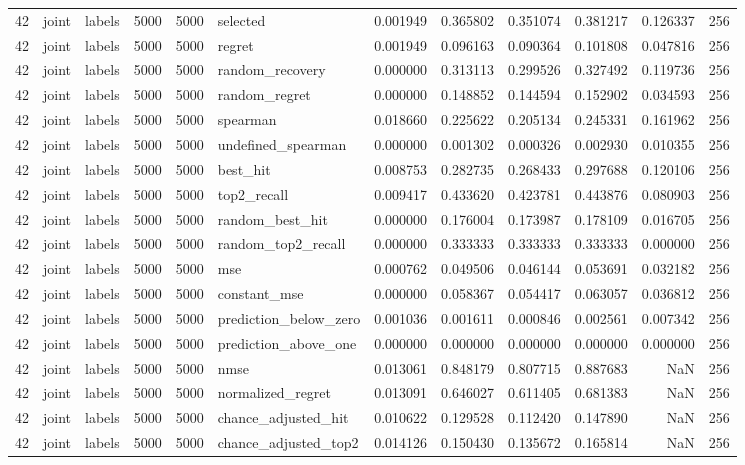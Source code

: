 \begin{tabular}{rllrrlrrrrrr}
42 & joint & labels & 5000 & 5000 & selected & 0.001949 & 0.365802 & 0.351074 & 0.381217 & 0.126337 & 256 \\
42 & joint & labels & 5000 & 5000 & regret & 0.001949 & 0.096163 & 0.090364 & 0.101808 & 0.047816 & 256 \\
42 & joint & labels & 5000 & 5000 & random_recovery & 0.000000 & 0.313113 & 0.299526 & 0.327492 & 0.119736 & 256 \\
42 & joint & labels & 5000 & 5000 & random_regret & 0.000000 & 0.148852 & 0.144594 & 0.152902 & 0.034593 & 256 \\
42 & joint & labels & 5000 & 5000 & spearman & 0.018660 & 0.225622 & 0.205134 & 0.245331 & 0.161962 & 256 \\
42 & joint & labels & 5000 & 5000 & undefined_spearman & 0.000000 & 0.001302 & 0.000326 & 0.002930 & 0.010355 & 256 \\
42 & joint & labels & 5000 & 5000 & best_hit & 0.008753 & 0.282735 & 0.268433 & 0.297688 & 0.120106 & 256 \\
42 & joint & labels & 5000 & 5000 & top2_recall & 0.009417 & 0.433620 & 0.423781 & 0.443876 & 0.080903 & 256 \\
42 & joint & labels & 5000 & 5000 & random_best_hit & 0.000000 & 0.176004 & 0.173987 & 0.178109 & 0.016705 & 256 \\
42 & joint & labels & 5000 & 5000 & random_top2_recall & 0.000000 & 0.333333 & 0.333333 & 0.333333 & 0.000000 & 256 \\
42 & joint & labels & 5000 & 5000 & mse & 0.000762 & 0.049506 & 0.046144 & 0.053691 & 0.032182 & 256 \\
42 & joint & labels & 5000 & 5000 & constant_mse & 0.000000 & 0.058367 & 0.054417 & 0.063057 & 0.036812 & 256 \\
42 & joint & labels & 5000 & 5000 & prediction_below_zero & 0.001036 & 0.001611 & 0.000846 & 0.002561 & 0.007342 & 256 \\
42 & joint & labels & 5000 & 5000 & prediction_above_one & 0.000000 & 0.000000 & 0.000000 & 0.000000 & 0.000000 & 256 \\
42 & joint & labels & 5000 & 5000 & nmse & 0.013061 & 0.848179 & 0.807715 & 0.887683 & NaN & 256 \\
42 & joint & labels & 5000 & 5000 & normalized_regret & 0.013091 & 0.646027 & 0.611405 & 0.681383 & NaN & 256 \\
42 & joint & labels & 5000 & 5000 & chance_adjusted_hit & 0.010622 & 0.129528 & 0.112420 & 0.147890 & NaN & 256 \\
42 & joint & labels & 5000 & 5000 & chance_adjusted_top2 & 0.014126 & 0.150430 & 0.135672 & 0.165814 & NaN & 256 \\

\end{tabular}
